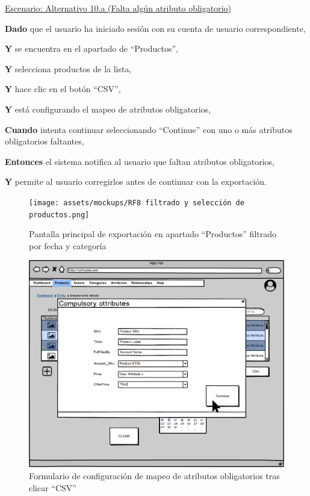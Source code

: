 \vspace{0.20cm}

\underline{Escenario: Alternativo 10.a (Falta algún atributo obligatorio)}\par
\vspace{0.15cm}
\textbf{Dado} que el usuario ha iniciado sesión con su cuenta de usuario correspondiente,\par
\textbf{Y} se encuentra en el apartado de \enquote{Productos},\par
\textbf{Y} selecciona productos de la lista,\par
\textbf{Y} hace clic en el botón \enquote{CSV},\par
\textbf{Y} está configurando el mapeo de atributos obligatorios,\par
\textbf{Cuando} intenta continuar seleccionando \enquote{Continue} con uno o más atributos obligatorios faltantes,\par
\textbf{Entonces} el sistema notifica al usuario que faltan atributos obligatorios,\par
\textbf{Y} permite al usuario corregirlos antes de continuar con la exportación.\par


\begin{figure}[H]
    \texttt{[image: assets/mockups/RF8 filtrado y selección de productos.png]}
    \caption{Pantalla principal de exportación en apartado \enquote{Productos} filtrado por fecha y categoría}
\end{figure}

\begin{figure}[H]
    \includegraphics[width=1\linewidth]{assets/mockups/RF8 Seleccion de atributos obligatorios.png}
    \caption{Formulario de configuración de mapeo de atributos obligatorios tras clicar \enquote{CSV}}
\end{figure}

